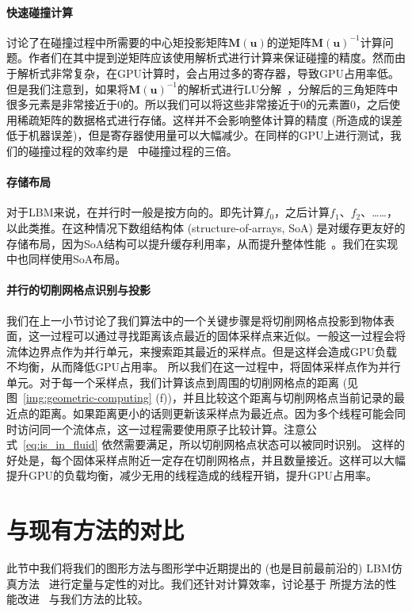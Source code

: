 \paragraph{快速碰撞计算}
\citet{Chen-2021} 讨论了在碰撞过程中所需要的中心矩投影矩阵$\bm{M}(\bm{u})$的逆矩阵$\bm{M}(\bm{u})^{-1}$计算问题。作者们在其中提到逆矩阵应该使用解析式进行计算来保证碰撞的精度。然而由于解析式非常复杂，在GPU计算时，会占用过多的寄存器，导致GPU占用率低。但是我们注意到，如果将$\bm{M}(\bm{u})^{-1}$的解析式进行LU分解~\citep{fei2018three}，分解后的三角矩阵中很多元素是非常接近于0的。所以我们可以将这些非常接近于0的元素置0，之后使用稀疏矩阵的数据格式进行存储。这样并不会影响整体计算的精度 (所造成的误差低于机器误差)，但是寄存器使用量可以大幅减少。在同样的GPU上进行测试，我们的碰撞过程的效率约是~\citep{Chen-2021} 中碰撞过程的三倍。

\paragraph{存储布局}
对于LBM来说，在并行时一般是按方向的。即先计算$f_0$，之后计算$f_1$、$f_2$、……，以此类推。在这种情况下数组结构体 (structure-of-arrays, SoA) 是对缓存更友好的存储布局，因为SoA结构可以提升缓存利用率，从而提升整体性能~\citep{Chen-2021}。我们在实现中也同样使用SoA布局。

\paragraph{并行的切削网格点识别与投影}
我们在上一小节讨论了我们算法中的一个关键步骤是将切削网格点投影到物体表面，这一过程可以通过寻找距离该点最近的固体采样点来近似。一般这一过程会将流体边界点作为并行单元，来搜索距其最近的采样点。但是这样会造成GPU负载不均衡，从而降低GPU占用率。
所以我们在这一过程中，将固体采样点作为并行单元。对于每一个采样点，我们计算该点到周围的切削网格点的距离 (见图~\ref{img:geometric-computing} (f))，并且比较这个距离与切削网格点当前记录的最近点的距离。如果距离更小的话则更新该采样点为最近点。因为多个线程可能会同时访问同一个流体点，这一过程需要使用原子比较计算。注意公式~\ref{eq:is_in_fluid} 依然需要满足，所以切削网格点状态可以被同时识别。
这样的好处是，每个固体采样点附近一定存在切削网格点，并且数量接近。这样可以大幅提升GPU的负载均衡，减少无用的线程造成的线程开销，提升GPU占用率。

\section{与现有方法的对比}
\label{sec:siga21_comp}
此节中我们将我们的图形方法与图形学中近期提出的 (也是目前最前沿的) LBM仿真方法~\citep{Li-2020} 进行定量与定性的对比。我们还针对计算效率，讨论基于 \citet{Li-2020} 所提方法的性能改进~\citep{Chen-2021} 与我们方法的比较。

